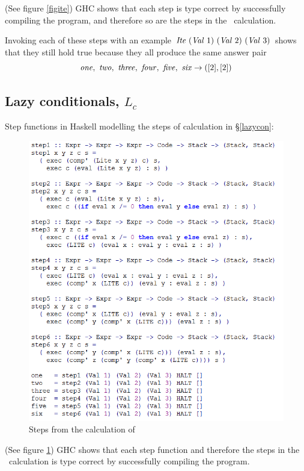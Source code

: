 \documentclass {article}
\begin{document}
(See figure \ref{figite})
GHC shows that each step is type correct by 
successfully compiling the program, 
and
therefore so are the steps in the \ite\ calculation.

Invoking each of these steps
with an example 
\( \mathit{Ite\ } (\mathit{Val\ } 1)\ (\mathit{Val\ } 2)\ (\mathit{Val\ } 3) \)
shows that they still hold true
because they all produce the same answer pair
\begin{equation*}
\mathit{one,\ two,\ three,\ four,\ five,\ six } 
		\rightarrow ([2], [2]) \\
\end{equation*}

\subsection{Lazy conditionals, $L_c$}

Step functions in Haskell modelling the
steps of calculation in \S\ref{lazycon}:
\begin{figure}[h]
\includegraphics[scale=0.8]{Litesteps}
\caption{Steps from the calculation of \lite}
\label{figlite}
\end{figure}

(See figure \ref{figlite})
GHC shows that each step function 
and therefore the 
steps in the \lite\ calculation is type correct
by successfully compiling the program.
\end{document}
